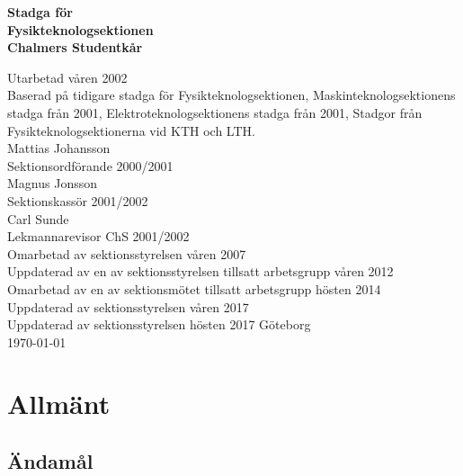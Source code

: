 \documentclass[11pt,a4paper]{article}
\begin{document}

\setlength{\headheight}{14pt}

  \begin{center}
    \textbf{\Huge{Stadga för}}\\[3mm]
    \textbf{\Huge{Fysikteknologsektionen}}\\
    \vspace{.7 cm}
    \textbf{\Large{Chalmers Studentkår}}


    \vfill

    Utarbetad våren 2002\\[5mm]
    Baserad på tidigare stadga för Fysikteknologsektionen,
    Maskinteknologsektionens stadga från 2001, Elektroteknologsektionens
    stadga från 2001, Stadgor från Fysikteknologsektionerna vid KTH och
LTH.\\[5mm]
    Mattias Johansson\\
    Sektionsordförande 2000/2001\\[5mm]
    Magnus Jonsson\\
    Sektionskassör 2001/2002\\[5mm]
    Carl Sunde\\
    Lekmannarevisor ChS 2001/2002\\[5mm]
    Omarbetad av sektionsstyrelsen våren 2007\\[5mm]
    Uppdaterad av en av sektionsstyrelsen tillsatt arbetsgrupp våren 2012\\[5mm]
    Omarbetad av en av sektionsmötet tillsatt arbetsgrupp hösten 2014\\[5mm]
    Uppdaterad av sektionsstyrelsen våren 2017\\
    Uppdaterad av sektionsstyrelsen hösten 2017
    \vspace{.3 cm}
    \small{Göteborg}\\
    \small{\today}
  \end{center}

\clearpage


\tableofcontents

\clearpage



\section{Allmänt}

\subsection{Ändamål}
\end{document}
